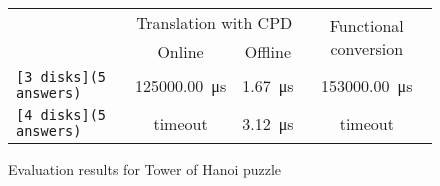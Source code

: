 \begin{figure*}[t!]
    \centering
      \begin{tabular}{l||c||c||c}
      & \multicolumn{2}{c||}{Translation with CPD} & \multicolumn{1}{c}{\multirow[t]{2}{*}{Functional conversion}} \\ 
      & Online & Offline & \multicolumn{1}{c}{} \\ \hline
      \texttt{{[}3 disks{]}(5 answers)} & \SI{125000.00}{\micro\second} & \SI{1.67}{\micro\second} & \SI{153000.00}{\micro\second} \\
      \texttt{{[}4 disks{]}(5 answers)} & timeout & \SI{3.12}{\micro\second} & timeout \\
      \end{tabular}
  \caption{Evaluation results for Tower of Hanoi puzzle}
  \label{tbl2:hanoi} 
\end{figure*}